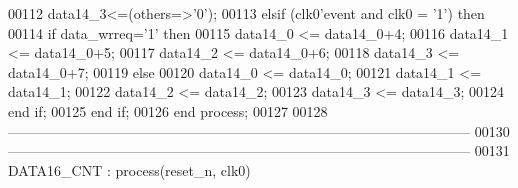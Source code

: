 \begin{DoxyCode}
00112          \textcolor{vhdlchar}{data14_3}\textcolor{vhdlchar}{<=}\textcolor{vhdlchar}{(}\textcolor{keywordflow}{others}\textcolor{vhdlchar}{=}\textcolor{vhdlchar}{>}\textcolor{vhdlchar}{'}\textcolor{vhdllogic}{}\textcolor{vhdllogic}{0}\textcolor{vhdlchar}{'}\textcolor{vhdlchar}{)};  
00113       \textcolor{keywordflow}{elsif} \textcolor{vhdlchar}{(}\textcolor{vhdlchar}{clk0}\textcolor{vhdlchar}{'}\textcolor{vhdlkeyword}{event} \textcolor{keywordflow}{and} \textcolor{vhdlchar}{clk0} \textcolor{vhdlchar}{=} \textcolor{vhdlchar}{'}\textcolor{vhdllogic}{}\textcolor{vhdllogic}{1}\textcolor{vhdlchar}{'}\textcolor{vhdlchar}{)} \textcolor{keywordflow}{then}
00114          \textcolor{keywordflow}{if} \textcolor{vhdlchar}{data_wrreq}\textcolor{vhdlchar}{=}\textcolor{vhdlchar}{'}\textcolor{vhdllogic}{}\textcolor{vhdllogic}{1}\textcolor{vhdlchar}{'} \textcolor{keywordflow}{then}   
00115             \textcolor{vhdlchar}{data14_0} \textcolor{vhdlchar}{<=} \textcolor{vhdlchar}{data14_0}\textcolor{vhdlchar}{+}\textcolor{vhdllogic}{}\textcolor{vhdllogic}{4};
00116             \textcolor{vhdlchar}{data14_1} \textcolor{vhdlchar}{<=} \textcolor{vhdlchar}{data14_0}\textcolor{vhdlchar}{+}\textcolor{vhdllogic}{}\textcolor{vhdllogic}{5};
00117             \textcolor{vhdlchar}{data14_2} \textcolor{vhdlchar}{<=} \textcolor{vhdlchar}{data14_0}\textcolor{vhdlchar}{+}\textcolor{vhdllogic}{}\textcolor{vhdllogic}{6};
00118             \textcolor{vhdlchar}{data14_3} \textcolor{vhdlchar}{<=} \textcolor{vhdlchar}{data14_0}\textcolor{vhdlchar}{+}\textcolor{vhdllogic}{}\textcolor{vhdllogic}{7}; 
00119          \textcolor{keywordflow}{else} 
00120             \textcolor{vhdlchar}{data14_0} \textcolor{vhdlchar}{<=} \textcolor{vhdlchar}{data14_0};
00121             \textcolor{vhdlchar}{data14_1} \textcolor{vhdlchar}{<=} \textcolor{vhdlchar}{data14_1};
00122             \textcolor{vhdlchar}{data14_2} \textcolor{vhdlchar}{<=} \textcolor{vhdlchar}{data14_2};
00123             \textcolor{vhdlchar}{data14_3} \textcolor{vhdlchar}{<=} \textcolor{vhdlchar}{data14_3}; 
00124          \textcolor{keywordflow}{end} \textcolor{keywordflow}{if};
00125       \textcolor{keywordflow}{end} \textcolor{keywordflow}{if};
00126    \textcolor{keywordflow}{end} \textcolor{keywordflow}{process};
00127    
00128 \textcolor{keyword}{   ---------------------------------------------------------------------------------------------------}
00130 \textcolor{keyword}{   ---------------------------------------------------------------------------------------------------}
00131    DATA16\_CNT : \textcolor{keywordflow}{process}(reset_n, clk0)

\end{DoxyCode}
